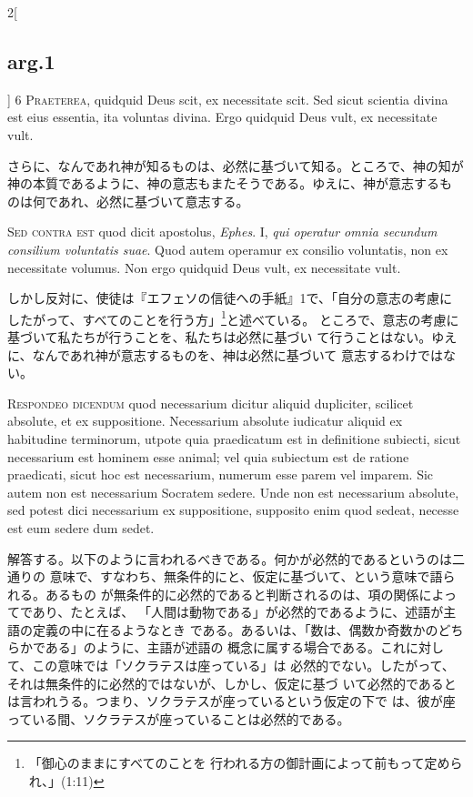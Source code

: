 \documentclass[paper=a4paper,fontsize=10pt,jafontsize=9pt,titlepage]{jlreq}
\begin{document}
\begin{paracol}{2}[\subsection{arg.1}]
{\scshape 6 Praeterea}, quidquid Deus scit, ex
necessitate scit. Sed sicut scientia divina est eius essentia, ita
voluntas divina. Ergo quidquid Deus vult, ex necessitate vult.

\switchcolumn

さらに、なんであれ神が知るものは、必然に基づいて知る。ところで、神の知が
 神の本質であるように、神の意志もまたそうである。ゆえに、神が意志するも
 のは何であれ、必然に基づいて意志する。

\switchcolumn*[\subsection{s.c.}]


{\scshape  Sed contra est} quod dicit apostolus,
{\itshape Ephes}. I, {\itshape qui operatur omnia secundum consilium voluntatis suae}. Quod
autem operamur ex consilio voluntatis, non ex necessitate volumus. Non
ergo quidquid Deus vult, ex necessitate vult.

\switchcolumn

しかし反対に、使徒は『エフェソの信徒への手紙』1で、「自分の意志の考慮に
 したがって、すべてのことを行う方」\footnote{「御心のままにすべてのことを
 行われる方の御計画によって前もって定められ、」(1:11)}と述べている。
 ところで、意志の考慮に基づいて私たちが行うことを、私たちは必然に基づい
 て行うことはない。ゆえに、なんであれ神が意志するものを、神は必然に基づいて
 意志するわけではない。



{\scshape Respondeo dicendum} quod necessarium dicitur
aliquid dupliciter, scilicet absolute, et ex suppositione. Necessarium
absolute iudicatur aliquid ex habitudine terminorum, utpote quia
praedicatum est in definitione subiecti, sicut necessarium est hominem
esse animal; vel quia subiectum est de ratione praedicati, sicut hoc est
necessarium, numerum esse parem vel imparem. Sic autem non est
necessarium Socratem sedere. Unde non est necessarium absolute, sed
potest dici necessarium ex suppositione, supposito enim quod sedeat,
 necesse est eum sedere dum sedet.

\switchcolumn

解答する。以下のように言われるべきである。何かが必然的であるというのは二通りの
 意味で、すなわち、無条件的にと、仮定に基づいて、という意味で語られる。あるもの
 が無条件的に必然的であると判断されるのは、項の関係によってであり、たとえば、
 「人間は動物である」が必然的であるように、述語が主語の定義の中に在るようなとき
 である。あるいは、「数は、偶数か奇数かのどちらかである」のように、主語が述語の
 概念に属する場合である。これに対して、この意味では「ソクラテスは座っている」は
 必然的でない。したがって、それは無条件的に必然的ではないが、しかし、仮定に基づ
 いて必然的であるとは言われうる。つまり、ソクラテスが座っているという仮定の下で
 は、彼が座っている間、ソクラテスが座っていることは必然的である。


\end{paracol}
\end{document}
